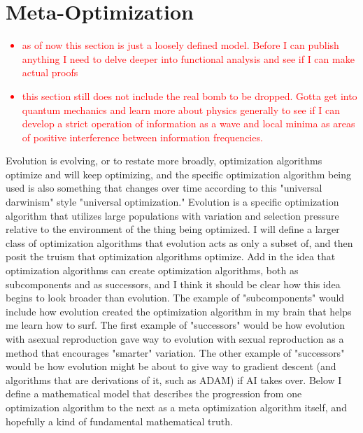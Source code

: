 \documentclass{article}[10pt]
\begin{document}
\newpage
\section{Meta-Optimization}
\label{section:metaOptimization}

\textcolor{red}{\begin{itemize}
    \item as of now this section is just a loosely defined model.
    Before I can publish anything I need to delve deeper into functional analysis and see if I can make actual proofs
    \item this section still does not include the real bomb to be dropped.
    Gotta get into quantum mechanics and learn more about physics generally to see if I can develop a strict operation of information as a wave and local minima as areas of positive interference between information frequencies.
\end{itemize}}

Evolution is evolving, or to restate more broadly, optimization algorithms optimize and will keep optimizing, and the specific optimization algorithm being used is also something that changes over time according to this "universal darwinism" style "universal optimization." 
Evolution is a specific optimization algorithm that utilizes large populations with variation and selection pressure relative to the environment of the thing being optimized. 
I will define a larger class of optimization algorithms that evolution acts as only a subset of, and then posit the truism that optimization algorithms optimize. 
Add in the idea that optimization algorithms can create optimization algorithms, both as subcomponents and as successors, and I think it should be clear how this idea begins to look broader than evolution. 
The example of "subcomponents" would include how evolution created the optimization algorithm in my brain that helps me learn how to surf. 
The first example of "successors" would be how evolution with asexual reproduction gave way to evolution with sexual reproduction as a method that encourages "smarter" variation. 
The other example of "successors" would be how evolution might be about to give way to gradient descent (and algorithms that are derivations of it, such as ADAM) if AI takes over. 
Below I define a mathematical model that describes the progression from one optimization algorithm to the next as a meta optimization algorithm itself, and hopefully a kind of fundamental mathematical truth. \par
\end{document}
